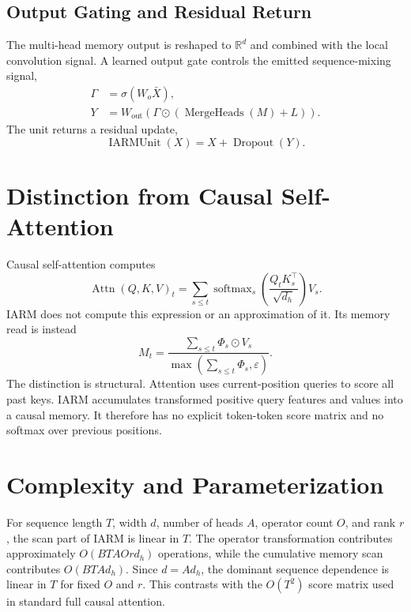\documentclass[10pt]{article}
\newcommand{\R}{\mathbb{R}}
\newcommand{\od}{\odot}
\begin{document}
\subsection{Output Gating and Residual Return}
The multi-head memory output is reshaped to $\R^d$ and combined with the local convolution signal. A learned output gate controls the emitted sequence-mixing signal,
\begin{align}
\Gamma &= \sigma(W_o\bar X),\\
Y &= W_{\mathrm{out}}\left(\Gamma\od (\operatorname{MergeHeads}(M)+L)\right).
\end{align}
The unit returns a residual update,
\begin{equation}
\operatorname{IARMUnit}(X)=X+\operatorname{Dropout}(Y).
\end{equation}

\section{Distinction from Causal Self-Attention}
Causal self-attention computes
\begin{equation}
\operatorname{Attn}(Q,K,V)_t
=
\sum_{s\leq t}
\operatorname{softmax}_{s}\left(\frac{Q_tK_s^{\top}}{\sqrt{d_h}}\right)V_s.
\end{equation}
IARM does not compute this expression or an approximation of it. Its memory read is instead
\begin{equation}
M_t=
\frac{\sum_{s\leq t}\Phi_s\od V_s}
{\max\left(\sum_{s\leq t}\Phi_s,\varepsilon\right)}.
\end{equation}
The distinction is structural. Attention uses current-position queries to score all past keys. IARM accumulates transformed positive query features and values into a causal memory. It therefore has no explicit token-token score matrix and no softmax over previous positions.

\section{Complexity and Parameterization}
For sequence length $T$, width $d$, number of heads $A$, operator count $O$, and rank $r$, the scan part of IARM is linear in $T$. The operator transformation contributes approximately $O(BTAOrd_h)$ operations, while the cumulative memory scan contributes $O(BTAd_h)$. Since $d=Ad_h$, the dominant sequence dependence is linear in $T$ for fixed $O$ and $r$. This contrasts with the $O(T^2)$ score matrix used in standard full causal attention.
\end{document}
